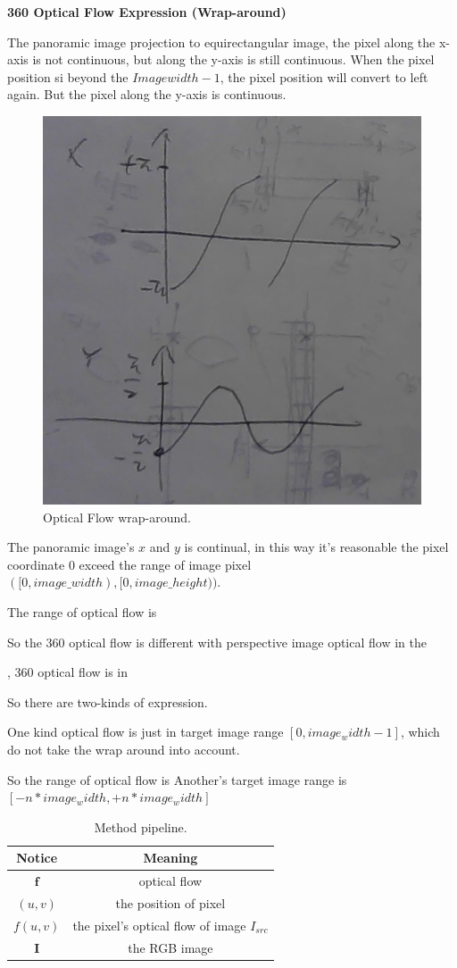 \textbf{360 Optical Flow Expression (Wrap-around)}

The panoramic image projection to equirectangular image, the pixel along the x-axis is not continuous, but along the y-axis is still continuous. When the pixel position si beyond the  ${Imagewidth -1}$, the pixel position will convert to left again.
But the pixel along the y-axis is continuous.

\begin{figure}[hbt!]
	\centering
	\includegraphics[width=0.45\linewidth]{images/wrap-around-0.jpg}
	\caption{Optical Flow wrap-around.}
	\label{fig:app:warparound}
\end{figure}

The panoramic image's $x$ and $y$ is continual, in this way it's reasonable the pixel coordinate 0 exceed the range of image pixel $([0, image\_width), [0, image\_height))$. 

The range of optical flow is 

So the 360 optical flow is different with perspective image optical flow in the 

, 360 optical flow is  in 

So there are two-kinds of expression.

One kind optical flow is just in target image range $[0, image_width - 1]$, which do not take the wrap around into account.

So the range of optical flow is 
Another's target image range is $[- n * image_width, + n * image_width]$


\begin{table}
	\begin{center}
		\begin{tabular}{ c | c } 
			\hline
			Notice & Meaning  \\ [0.5ex] 
			\hline\hline
			$\textbf{f}$ & optical flow  \\ 
			\hline
			$(u,v)$ & the position of pixel   \\
			\hline
			$f(u,v)$ & the pixel's optical flow of image $I_{src}$ \\
			\hline
			$\textbf{I}$ & the RGB image  \\ [1ex] 
			\hline
		\end{tabular}
	\end{center}
	\caption{Method pipeline. }
	\label{tab:approach:notation}
\end{table}

